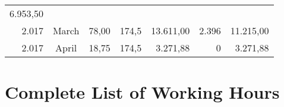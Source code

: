 \documentclass[11pt,A4paper,]{article}
\begin{document}
\begin{longtable}[]{@{}rcrrrrr@{}}
\begin{minipage}[t]{0.20\columnwidth}
6.953,50\strut
\end{minipage}\tabularnewline
\begin{minipage}[t]{0.09\columnwidth}\raggedleft\strut
2.017\strut
\end{minipage} & \begin{minipage}[t]{0.13\columnwidth}\centering\strut
March\strut
\end{minipage} & \begin{minipage}[t]{0.09\columnwidth}\raggedleft\strut
78,00\strut
\end{minipage} & \begin{minipage}[t]{0.09\columnwidth}\raggedleft\strut
174,5\strut
\end{minipage} & \begin{minipage}[t]{0.13\columnwidth}\raggedleft\strut
13.611,00\strut
\end{minipage} & \begin{minipage}[t]{0.09\columnwidth}\raggedleft\strut
2.396\strut
\end{minipage} & \begin{minipage}[t]{0.20\columnwidth}\raggedleft\strut
11.215,00\strut
\end{minipage}\tabularnewline
\begin{minipage}[t]{0.09\columnwidth}\raggedleft\strut
2.017\strut
\end{minipage} & \begin{minipage}[t]{0.13\columnwidth}\centering\strut
April\strut
\end{minipage} & \begin{minipage}[t]{0.09\columnwidth}\raggedleft\strut
18,75\strut
\end{minipage} & \begin{minipage}[t]{0.09\columnwidth}\raggedleft\strut
174,5\strut
\end{minipage} & \begin{minipage}[t]{0.13\columnwidth}\raggedleft\strut
3.271,88\strut
\end{minipage} & \begin{minipage}[t]{0.09\columnwidth}\raggedleft\strut
0\strut
\end{minipage} & \begin{minipage}[t]{0.20\columnwidth}\raggedleft\strut
3.271,88\strut
\end{minipage}\tabularnewline
\bottomrule
\end{longtable}

\section{Complete List of Working
Hours}\label{complete-list-of-working-hours}
\end{document}
